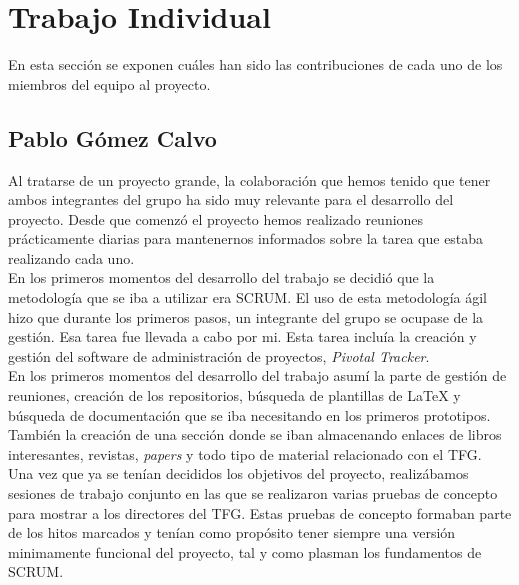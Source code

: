 
\chapter{Trabajo Individual}
\label{cap7}
\label{cap:individual}

En esta secci\'on se exponen cu\'ales han sido las contribuciones de cada uno de los miembros del equipo al proyecto.\\



\section{Pablo G\'omez Calvo}

Al tratarse de un proyecto grande, la colaboraci\'on que hemos tenido que tener ambos integrantes del grupo ha sido muy relevante para el desarrollo del proyecto. Desde que comenz\'o el proyecto hemos realizado reuniones pr\'acticamente diarias para mantenernos informados sobre la tarea que estaba realizando cada uno. \\

En los primeros momentos del desarrollo del trabajo se decidi\'o que la metodolog\'ia que se iba a utilizar era SCRUM. El uso de esta metodolog\'ia \'agil hizo que durante los primeros pasos, un integrante del grupo se ocupase de la gesti\'on. Esa tarea fue llevada a cabo por mi. Esta tarea inclu\'ia la creaci\'on y gesti\'on del software de administraci\'on de proyectos, \textit{Pivotal Tracker}.\\

En los primeros momentos del desarrollo del trabajo asum\'i la parte de gesti\'on de reuniones, creaci\'on de los repositorios, b\'usqueda de plantillas de LaTeX y  b\'usqueda de documentaci\'on que se iba necesitando en los primeros prototipos. Tambi\'en la creaci\'on de una secci\'on donde se iban almacenando enlaces de libros interesantes, revistas, \textit{papers} y todo tipo de material relacionado con el TFG.\\

Una vez que ya se ten\'ian decididos los objetivos del proyecto, realiz\'abamos sesiones de trabajo conjunto en las que se realizaron varias pruebas de concepto para mostrar a los directores del TFG. Estas pruebas de concepto formaban parte de los hitos marcados y ten\'ian como prop\'osito tener siempre una versi\'on minimamente funcional del proyecto, tal y como plasman los fundamentos de SCRUM.\\

